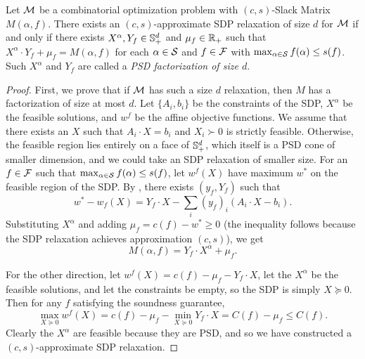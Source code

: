 \begin{theorem}\label{thm:yannakakis}
Let $\mathcal M$ be a combinatorial optimization problem with $(c,s)$-Slack Matrix $M(\alpha,f)$. There exists an $(c,s)$-approximate SDP relaxation of size $d$ for $\mathcal M$ if and only if there exists $X^\alpha,Y_f \in \mathbb{S}^{d}_+$ and $\mu_f \in \mathbb R_+$ such that $X^\alpha \cdot Y_f + \mu_f = M(\alpha,f)$ for each $\alpha \in \mathcal S $ and $f \in \mathcal F$ with $\max_{\alpha \in \mathcal S} f(\alpha) \leq s(f)$. Such $X^\alpha$ and $Y_f$ are called a \emph{PSD factorization of size $d$}.
\end{theorem}
\begin{proof}
First, we prove that if $\mathcal M$ has such a size $d$ relaxation, then $M$ has a factorization of size at most $d$. Let $\{A_i, b_i\}$ be the constraints of the SDP, $X^\alpha$ be the feasible solutions, and $w^f$ be the affine objective functions. We assume that there exists an $X$ such that $A_i \cdot X = b_i$ and $X_i \succ 0$ is strictly feasible. Otherwise, the feasible region lies entirely on a face of $\mathbb{S}^{d}_+$, which itself is a PSD cone of smaller dimension, and we could take an SDP relaxation of smaller size. For an $f \in \mathcal F$ such that $\max_{\alpha \in \mathcal S} f(\alpha) \leq s(f)$, let $w^f(X)$ have maximum $w^*$ on the feasible region of the SDP. By , there exists $(y_f, Y_f)$ such that
\[w^* - w_f(X) = Y_f \cdot X - \sum_i (y_f)_i(A_i \cdot X - b_i).\]
Substituting $X^\alpha$ and adding $\mu_f = c(f) - w^* \geq 0$ (the inequality follows because the SDP relaxation achieves approximation $(c,s)$), we get
\[M(\alpha,f) = Y_f \cdot X^\alpha + \mu_f.\]

For the other direction, let $w^f(X) = c(f) - \mu_f - Y_f \cdot X$, let the $X^\alpha$ be the feasible solutions, and let the constraints be empty, so the SDP is simply $X \succeq 0$. Then for any $f$ satisfying the soundness guarantee,
\[\max_{X \succeq 0} w^f(X) = c(f) - \mu_f - \min_{X \succeq 0} Y_f \cdot X = C(f) - \mu_f \leq C(f).\]
Clearly the $X^\alpha$ are feasible because they are PSD, and so we have constructed a $(c,s)$-approximate SDP relaxation.
\end{proof}

